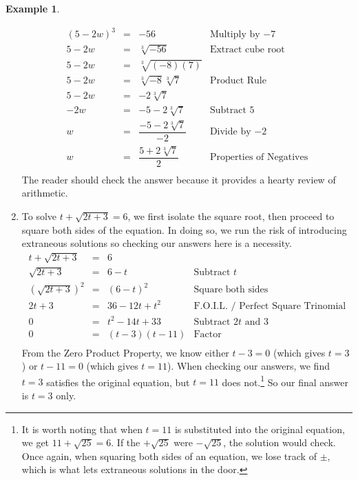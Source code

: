 \documentclass[11pt]{article}
\theoremstyle{definition}  %
\newtheorem{ex}{\bf Example}
\begin{document}
\begin{ex}
\begin{enumerate}
\[\begin{array}{rclr}
(5-2w) ^ 3 & = & -56 & \text{Multiply by $-7$} \\[2pt]

5 - 2w & = & \sqrt[3]{-56} & \text{Extract cube root} \\[2pt]

5 - 2w & = & \sqrt[3]{(-8)(7)} & \\[2pt]

5 - 2w & = & \sqrt[3]{-8} \sqrt[3]{7} & \text{Product Rule}\\[2pt]

5 - 2w & = & -2\sqrt[3]{7} & \\[2pt]

-2w & = & -5-2 \sqrt[3]{7} & \text{Subtract $5$} \\[2pt]

w & = & \dfrac{-5 - 2\sqrt[3]{7}}{-2} & \text{Divide by $-2$} \\[8pt]

w & = & \dfrac{5 + 2\sqrt[3]{7}}{2} & \text{Properties of Negatives} \\

\end{array}\] The reader should check the answer because it provides a hearty review of arithmetic.

\item  To solve  $t + \sqrt{2t+3} = 6$, we first isolate the square root, then proceed to square both sides of the equation.  In doing so, we run the risk of introducing extraneous solutions so checking our answers here is a necessity. \[ \begin{array}{rclr}

t + \sqrt{2t+3}  & = & 6 & \\ [2pt]

\sqrt{2t+3} & = & 6 - t & \text{Subtract $t$} \\ [2pt]

(\sqrt{2t+3})^2 & = & (6-t)^2 & \text{Square both sides} \\ [2pt]

2t + 3 & = & 36-12t + t^2 & \text{F.O.I.L. / Perfect Square Trinomial} \\ [2pt]

0 & = & t^2 - 14t + 33 & \text{Subtract $2t$ and $3$} \\ [2pt]

0 & = & (t-3)(t-11) & \text{Factor} \\ \end{array} \] From the Zero Product Property, we know either $t - 3 = 0$ (which gives $t=3$) or $t-11 = 0$ (which gives $t=11$).  When checking our answers, we find $t = 3$ satisfies the original equation, but $t = 11$ does not.\footnote{It is worth noting that when $t=11$ is substituted into the original equation, we get $11 + \sqrt{25} = 6$.  If the $+\sqrt{25}$ were $-\sqrt{25}$, the solution would check. Once again, when squaring both sides of an equation, we lose track of $\pm$, which is what lets extraneous solutions in the door.}  So our final answer is $t = 3$ only.


\end{enumerate}
\end{ex}
\end{document}
